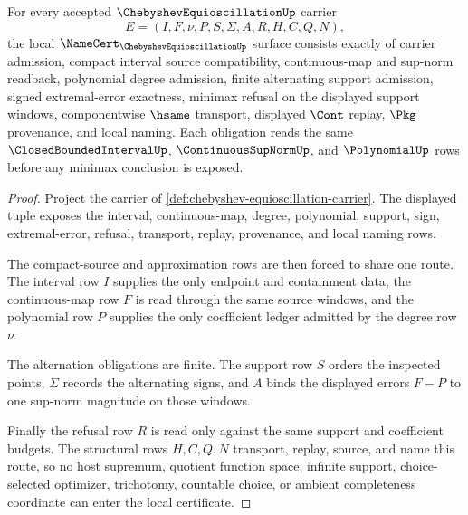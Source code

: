 \begin{theorem}
\label{thm:chebyshev-equioscillation-namecert-obligations}
For every accepted $\ChebyshevEquioscillationUp$ carrier
$$
E=(I,F,\nu,P,S,\Sigma,A,R,H,C,Q,N),
$$
the local $\NameCert_{\ChebyshevEquioscillationUp}$ surface consists exactly of carrier admission, compact interval source compatibility, continuous-map and sup-norm readback, polynomial degree admission, finite alternating support admission, signed extremal-error exactness, minimax refusal on the displayed support windows, componentwise $\hsame$ transport, displayed $\Cont$ replay, $\Pkg$ provenance, and local naming. Each obligation reads the same $\ClosedBoundedIntervalUp$, $\ContinuousSupNormUp$, and $\PolynomialUp$ rows before any minimax conclusion is exposed.
\end{theorem}
\begin{proof}
Project the carrier of \autoref{def:chebyshev-equioscillation-carrier}. The displayed tuple exposes the interval, continuous-map, degree, polynomial, support, sign, extremal-error, refusal, transport, replay, provenance, and local naming rows.

The compact-source and approximation rows are then forced to share one route. The interval row $I$ supplies the only endpoint and containment data, the continuous-map row $F$ is read through the same source windows, and the polynomial row $P$ supplies the only coefficient ledger admitted by the degree row $\nu$.

The alternation obligations are finite. The support row $S$ orders the inspected points, $\Sigma$ records the alternating signs, and $A$ binds the displayed errors $F-P$ to one sup-norm magnitude on those windows.

Finally the refusal row $R$ is read only against the same support and coefficient budgets. The structural rows $H,C,Q,N$ transport, replay, source, and name this route, so no host supremum, quotient function space, infinite support, choice-selected optimizer, trichotomy, countable choice, or ambient completeness coordinate can enter the local certificate.
\end{proof}

